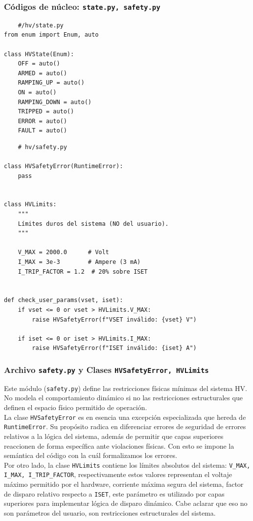 \documentclass{article}
\begin{document}
\subsubsection{Códigos de núcleo: \texttt{state.py, safety.py}}
\begin{lstlisting}
    #/hv/state.py
from enum import Enum, auto

class HVState(Enum):
    OFF = auto()
    ARMED = auto()
    RAMPING_UP = auto()
    ON = auto()
    RAMPING_DOWN = auto()
    TRIPPED = auto()
    ERROR = auto()
    FAULT = auto()
\end{lstlisting}
\begin{lstlisting}
    # hv/safety.py

class HVSafetyError(RuntimeError):
    pass


class HVLimits:
    """
    Límites duros del sistema (NO del usuario).
    """

    V_MAX = 2000.0      # Volt
    I_MAX = 3e-3        # Ampere (3 mA)
    I_TRIP_FACTOR = 1.2  # 20% sobre ISET


def check_user_params(vset, iset):
    if vset <= 0 or vset > HVLimits.V_MAX:
        raise HVSafetyError(f"VSET inválido: {vset} V")

    if iset <= 0 or iset > HVLimits.I_MAX:
        raise HVSafetyError(f"ISET inválido: {iset} A")
\end{lstlisting}

\subsubsection{Archivo \texttt{safety.py} y Clases \texttt{HVSafetyError, HVLimits}}

Este módulo (\texttt{safety.py}) define las restricciones físicas mínimas del sistema HV. No modela el comportamiento dinámico si no las restricciones estructurales que definen el espacio físico permitido de operación.\\

La clase \texttt{HVSafetyError} es en esencia una excepción especializada que hereda de \texttt{RuntimeError}. Su propósito radica en diferenciar errores de seguridad de errores relativos a la lógica del sistema, además de permitir que capas superiores reaccionen de forma específica ante violaciones físicas. Con esto se impone la semántica del código con la cuál formalizamos los errores. \\

Por otro lado, la clase \texttt{HVLimits} contiene los límites absolutos del sistema: \texttt{V\_MAX, I\_MAX, I\_TRIP\_FACTOR}, respectivamente estos valores representan el voltaje máximo permitido por el hardware, corriente máxima segura del sistema, factor de disparo relativo respecto a \texttt{ISET}, este parámetro es utilizado por capas superiores para implementar lógica de disparo dinámico. Cabe aclarar que eso no son parámetros del usuario, son restricciones estructurales del sistema. \\
\end{document}
